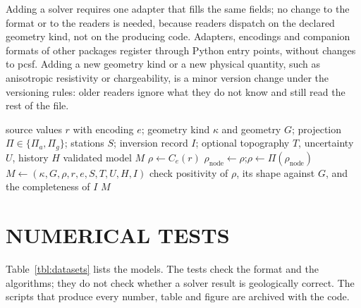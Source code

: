 \documentclass[manuscript]{geophysics}
\newcommand{\Mtri}{\mathsf{T}}
\begin{document}
Adding a solver requires one adapter that fills the same fields; no
change to the format or to the readers is needed, because readers
dispatch on the declared geometry kind, not on the producing code.
Adapters, encodings and companion formats of other packages register
through Python entry points, without changes to pcsf.
Adding a new geometry kind or a new physical quantity, such as
anisotropic resistivity or chargeability, is a minor version change
under the versioning rules: older readers ignore what they do not
know and still read the rest of the file.

\begin{algorithm}[htbp]
\caption{Conversion of solver output to a PCSF model.}
\label{alg:conversion}
\begin{algorithmic}[1]
\Require source values $r$ with encoding $e$; geometry kind $\kappa$ and
  geometry $G$; projection $\Pi \in \{\Pi_a, \Pi_g\}$; stations $S$;
  inversion record $I$; optional topography $T$, uncertainty $U$, history $H$
\Ensure validated model $M$
\State $\rho \gets C_e(r)$ 
\If{$\kappa = \Mtri$ and $r$ is given per node}
  \State $\rho_{\mathrm{node}} \gets \rho$;\quad $\rho \gets \Pi(\rho_{\mathrm{node}})$
\EndIf
\State $M \gets (\kappa, G, \rho, r, e, S, T, U, H, I)$
\State check positivity of $\rho$, its shape against $G$, and the completeness of $I$
\State \Return $M$
\end{algorithmic}
\end{algorithm}

\section{NUMERICAL TESTS}

Table~\ref{tbl:datasets} lists the models. The tests check the format
and the algorithms; they do not check whether a solver result is
geologically correct. The scripts that produce every number, table and
figure are archived with the code.
\end{document}
